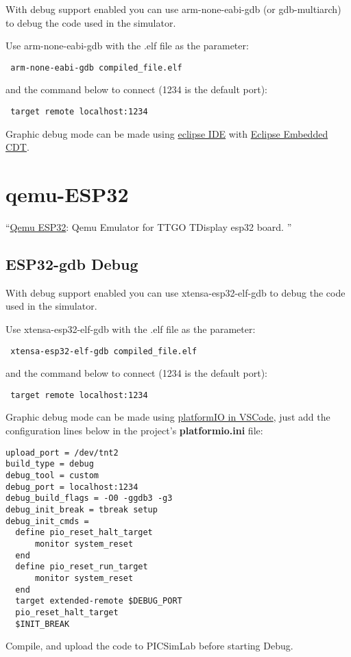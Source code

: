  With debug support enabled you can use arm-none-eabi-gdb (or gdb-multiarch) to debug the code used in the simulator. 
 
 Use arm-none-eabi-gdb with the .elf file as the parameter:
 \begin{verbatim}
 arm-none-eabi-gdb compiled_file.elf
 \end{verbatim}
 and the command below to connect (1234 is the default port):
 \begin{verbatim}
 target remote localhost:1234
 \end{verbatim}

Graphic debug mode can be made using \href{https://www.eclipse.org/}{eclipse IDE} with 
\href{https://projects.eclipse.org/projects/iot.embed-cdt}{Eclipse Embedded CDT}.

\section{qemu-ESP32}
 ``\href{https://github.com/a159x36/qemu}{Qemu ESP32}: Qemu Emulator for TTGO TDisplay esp32 board. ''
 
\subsection{ESP32-gdb Debug} \hypertarget{def:gdbesp}{}

 With debug support enabled you can use xtensa-esp32-elf-gdb to debug the code used in the simulator. 
 
 Use xtensa-esp32-elf-gdb with the .elf file as the parameter:
 \begin{verbatim}
 xtensa-esp32-elf-gdb compiled_file.elf
 \end{verbatim}
 and the command below to connect (1234 is the default port):
 \begin{verbatim}
 target remote localhost:1234
 \end{verbatim}

Graphic debug mode can be made using \href{https://platformio.org/}{platformIO in VSCode}, just add the configuration lines below in the project's \textbf{platformio.ini} file:
\begin{verbatim}
upload_port = /dev/tnt2
build_type = debug
debug_tool = custom
debug_port = localhost:1234
debug_build_flags = -O0 -ggdb3 -g3
debug_init_break = tbreak setup
debug_init_cmds =
  define pio_reset_halt_target
      monitor system_reset
  end
  define pio_reset_run_target
      monitor system_reset
  end
  target extended-remote $DEBUG_PORT
  pio_reset_halt_target
  $INIT_BREAK
\end{verbatim}
Compile, and upload the code to PICSimLab before starting Debug.
 
